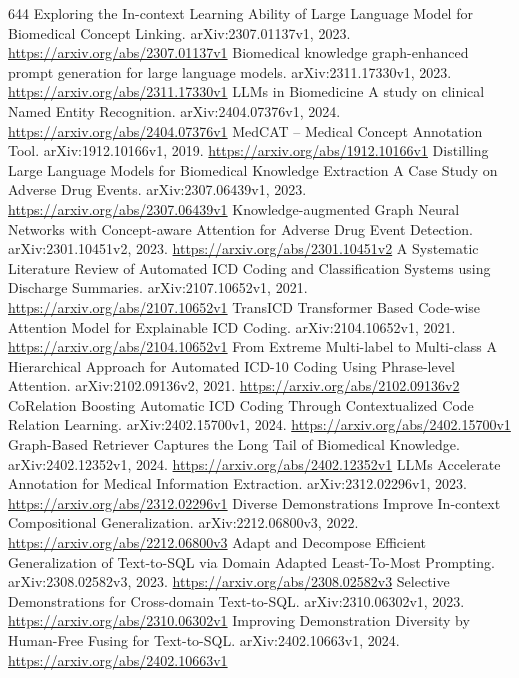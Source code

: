 \documentclass[11pt]{article}
\begin{document}
\begin{thebibliography}{644}
 Exploring the In-context Learning Ability of Large Language Model for Biomedical Concept Linking. arXiv:2307.01137v1, 2023. \url{https://arxiv.org/abs/2307.01137v1}
 Biomedical knowledge graph-enhanced prompt generation for large language models. arXiv:2311.17330v1, 2023. \url{https://arxiv.org/abs/2311.17330v1}
 LLMs in Biomedicine A study on clinical Named Entity Recognition. arXiv:2404.07376v1, 2024. \url{https://arxiv.org/abs/2404.07376v1}
 MedCAT -- Medical Concept Annotation Tool. arXiv:1912.10166v1, 2019. \url{https://arxiv.org/abs/1912.10166v1}
 Distilling Large Language Models for Biomedical Knowledge Extraction A Case Study on Adverse Drug Events. arXiv:2307.06439v1, 2023. \url{https://arxiv.org/abs/2307.06439v1}
 Knowledge-augmented Graph Neural Networks with Concept-aware Attention for Adverse Drug Event Detection. arXiv:2301.10451v2, 2023. \url{https://arxiv.org/abs/2301.10451v2}
 A Systematic Literature Review of Automated ICD Coding and Classification Systems using Discharge Summaries. arXiv:2107.10652v1, 2021. \url{https://arxiv.org/abs/2107.10652v1}
 TransICD Transformer Based Code-wise Attention Model for Explainable ICD Coding. arXiv:2104.10652v1, 2021. \url{https://arxiv.org/abs/2104.10652v1}
 From Extreme Multi-label to Multi-class A Hierarchical Approach for Automated ICD-10 Coding Using Phrase-level Attention. arXiv:2102.09136v2, 2021. \url{https://arxiv.org/abs/2102.09136v2}
 CoRelation Boosting Automatic ICD Coding Through Contextualized Code Relation Learning. arXiv:2402.15700v1, 2024. \url{https://arxiv.org/abs/2402.15700v1}
 Graph-Based Retriever Captures the Long Tail of Biomedical Knowledge. arXiv:2402.12352v1, 2024. \url{https://arxiv.org/abs/2402.12352v1}
 LLMs Accelerate Annotation for Medical Information Extraction. arXiv:2312.02296v1, 2023. \url{https://arxiv.org/abs/2312.02296v1}
 Diverse Demonstrations Improve In-context Compositional Generalization. arXiv:2212.06800v3, 2022. \url{https://arxiv.org/abs/2212.06800v3}
 Adapt and Decompose Efficient Generalization of Text-to-SQL via Domain Adapted Least-To-Most Prompting. arXiv:2308.02582v3, 2023. \url{https://arxiv.org/abs/2308.02582v3}
 Selective Demonstrations for Cross-domain Text-to-SQL. arXiv:2310.06302v1, 2023. \url{https://arxiv.org/abs/2310.06302v1}
 Improving Demonstration Diversity by Human-Free Fusing for Text-to-SQL. arXiv:2402.10663v1, 2024. \url{https://arxiv.org/abs/2402.10663v1}

\end{thebibliography}
\end{document}
